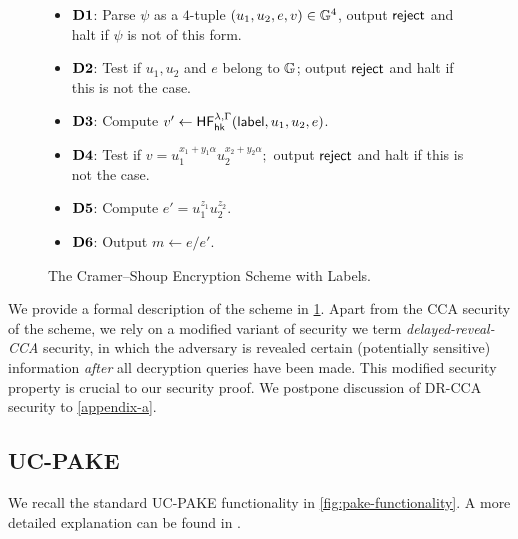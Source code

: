 \begin{figure}[tbp]
\begin{framed}
		\begin{itemize}
			\itemsep=0em
			\item[]\textbf{$\mathbf{D1}$}: Parse $\psi$ as a $4$-tuple $(u_1,u_2,e,v)\in\mathbb{G}^4$, output $\mathsf{reject}$ and halt if $\psi$ is not of this form.
			\item[]\textbf{$\mathbf{D2}$}: Test if $u_1, u_2$ and $e$ belong to $\mathbb{G}$; output $\mathsf{reject}$ and halt if this is not the case.
			\item[]\textbf{$\mathbf{D3}$}: Compute $v'\gets\mathsf{HF}^{\lambda,\Gamma}_{\mathsf{hk}}(\mathsf{label},u_1,u_2,e)$.
			\item[]\textbf{$\mathbf{D4}$}: Test if $v = u_1^{x_1+y_1\alpha}u_2^{x_2+y_2\alpha};$ output $\mathsf{reject}$ and halt if this is not the case.
			\item[]\textbf{$\mathbf{D5}$}: Compute $e' = u_1^{z_1}u_2^{z_2}$.
			\item[]\textbf{$\mathbf{D6}$}: Output $m\gets e/e'$.
		\end{itemize}
	\end{framed}
	\caption{The Cramer--Shoup Encryption Scheme with Labels.}
	\label{fig:cs03}
	\end{figure}

We provide a formal description of the scheme in \cref{fig:cs03}. Apart from the CCA security of the scheme, we rely on a modified variant of security we term \textit{delayed-reveal-CCA} security, in which the adversary is revealed certain (potentially sensitive) information \textit{after} all decryption queries have been made. This modified security property is crucial to our security proof. We postpone discussion of DR-CCA security to \cref{appendix-a}.

\subsection{UC-PAKE}
	
	We recall the standard UC-PAKE functionality \cite{EC:CHKLM05} in \cref{fig:pake-functionality}. A more detailed explanation can be found in \cite{PKC:RoyXu23}.
	
